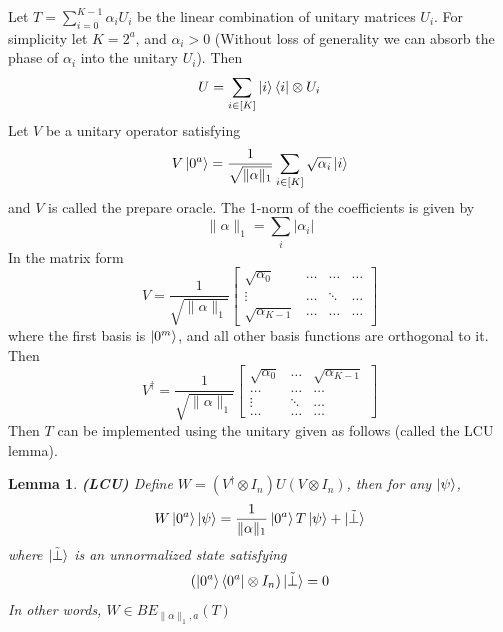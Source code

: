 \documentclass[12pt, oneside]{book}
\newtheorem{lemma}[theorem]{Lemma}
\theoremstyle{definition}
\theoremstyle{definition}
\theoremstyle{remark}
\begin{document}
Let $T=\sum_{i=0}^{K-1} \alpha_i U_i$ be the linear combination of unitary matrices $U_i$. For simplicity let $K=2^{a}$, and $\alpha_i >0$ (Without loss of generality we can absorb the phase of $\alpha_i$ into the unitary $U_i$). Then
\[
U=\sum_{i \in [K]} \ket{i}\bra{i} \otimes U_i
\]
Let $V$ be a unitary operator satisfying
\[
V\ket{0^a} = \frac{1}{\sqrt{\|\alpha\|_1}} \sum_{i \in [K]} \sqrt{\alpha_i} \ket{i}
\]
and $V$ is called the prepare oracle. The 1-norm of the coefficients is given by
\[
\|\alpha\|_1 = \sum_{i} |\alpha_i|
\]
In the matrix form
\[
V=\frac{1}{\sqrt{\|\alpha\|_1}}\begin{bmatrix} \sqrt{\alpha_0} & \ldots & \ldots & \ldots \\
\vdots & \ldots & \ddots & \ldots \\
\sqrt{\alpha_{K-1}} & \ldots & \ldots & \ldots \end{bmatrix}
\]
where the first basis is $\ket{0^m}$, and all other basis functions are orthogonal to it. Then
\[
V^{\dagger} = \frac{1}{\sqrt{\|\alpha\|_1}} \begin{bmatrix} \sqrt{\alpha_0} & \ldots & \sqrt{\alpha_{K-1}} \\
\ldots & \ldots & \ldots \\
\vdots & \ddots & \ldots \\
\ldots & \ldots & \ldots \end{bmatrix}
\]
Then $T$ can be implemented using the unitary given as follows (called the LCU lemma).
\begin{lemma}
    \textbf{(LCU)} Define $W=(V^{\dagger} \otimes I_n)U(V \otimes I_n)$, then for any $\ket{\psi}$,
    \[
    W\ket{0^a} \ket{\psi} = \frac{1}{\|\alpha\|_1} \ket{0^a}T\ket{\psi} + \ket{\tilde{\perp}}
    \]
    where $\ket{\tilde{\perp}}$ is an unnormalized state satisfying
    \[
    (\ket{0^a}\bra{0^a} \otimes I_n)\ket{\tilde{\perp}} = 0
    \]
    In other words, $W\in BE_{\|\alpha\|_1,a} (T)$
\end{lemma}
\end{document}
